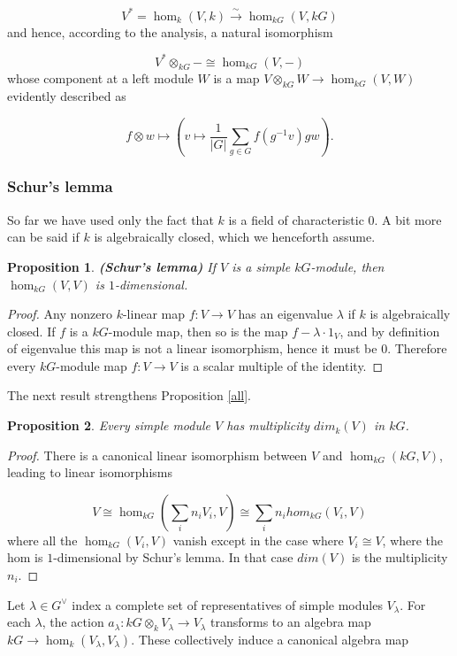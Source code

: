 \documentclass[12pt,titlepage]{article}
\theoremstyle{plain}
\newtheorem{prop}{Proposition}
\theoremstyle{definition}
\theoremstyle{remark}
\begin{document}
\begin{displaymath}
V^\ast = \hom_k(V, k) \stackrel{\sim}{\to} \hom_{k G}(V, k G)
\end{displaymath}
and hence, according to the analysis, a natural isomorphism

\begin{displaymath}
V^\ast \otimes_{k G} - \cong \hom_{k G}(V, -)
\end{displaymath}
whose component at a left module $W$ is a map $V \otimes_{k G} W \to \hom_{k G}(V, W)$ evidently described as

\begin{equation}
f \otimes w \mapsto \left(v \mapsto \frac1{{|G|}} \sum_{g \in G} f(g^{-1}v) g w \right).
\label{adj}\end{equation}
\hypertarget{schurs_lemma}{}\subsubsection*{{Schur's lemma}}\label{schurs_lemma}

So far we have used only the fact that $k$ is a field of characteristic $0$. A bit more can be said if $k$ is algebraically closed, which we henceforth assume.

\begin{prop}
\label{}\hypertarget{}{}
\textbf{(Schur's lemma)} If $V$ is a simple $k G$-module, then $\hom_{k G}(V, V)$ is $1$-dimensional.

\end{prop}
\begin{proof}
Any nonzero $k$-linear map $f: V \to V$ has an eigenvalue $\lambda$ if $k$ is algebraically closed. If $f$ is a $k G$-module map, then so is the map $f - \lambda \cdot 1_V$, and by definition of eigenvalue this map is not a linear isomorphism, hence it must be $0$. Therefore every $k G$-module map $f: V \to V$ is a scalar multiple of the identity.

\end{proof}
The next result strengthens Proposition \ref{all}.

\begin{prop}
\label{mult}\hypertarget{mult}{}
Every simple module $V$ has multiplicity $dim_k(V)$ in $k G$.

\end{prop}
\begin{proof}
There is a canonical linear isomorphism between $V$ and $\hom_{k G}(k G, V)$, leading to linear isomorphisms

\begin{displaymath}
V \cong \hom_{k G}(\sum_i n_i V_i, V) \cong \sum_i n_i hom_{k G}(V_i, V)
\end{displaymath}
where all the $\hom_{k G}(V_i, V)$ vanish except in the case where $V_i \cong V$, where the hom is $1$-dimensional by Schur's lemma. In that case $dim(V)$ is the multiplicity $n_i$.

\end{proof}
Let $\lambda \in G^\vee$ index a complete set of representatives of simple modules $V_\lambda$. For each $\lambda$, the action $a_\lambda: k G \otimes_k V_\lambda \to V_\lambda$ transforms to an algebra map $k G \to \hom_k(V_\lambda, V_\lambda)$. These collectively induce a canonical algebra map
\end{document}
